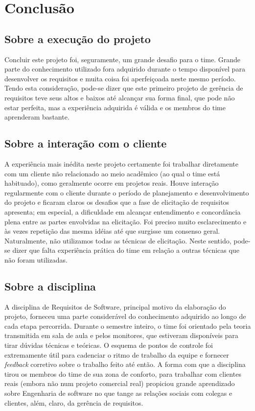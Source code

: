 \chapter[Conclusão]{Conclusão}

\section{Sobre a execução do projeto}
Concluir este projeto foi, seguramente, um grande desafio para o time. Grande parte do conhecimento utilizado fora adquirido durante o tempo disponível para desenvolver os requisitos e muita coisa foi aperfeiçoada neste mesmo período. Tendo esta consideração, pode-se dizer que este primeiro projeto de gerência de requisitos teve seus altos e baixos até alcançar sua forma final, que pode não estar perfeita, mas a experiência adquirida é válida e os membros do time aprenderam bastante.

\section{Sobre a interação com o cliente}
	A experiência mais inédita neste projeto certamente foi trabalhar diretamente com um cliente não relacionado ao meio acadêmico (ao qual o time está habituado), como geralmente ocorre em projetos reais.
Houve interação regularmente com o cliente durante o período de planejamento e desenvolvimento do projeto e ficaram claros os desafios que a fase de elicitação de requisitos apresenta; em especial, a dificuldade em alcançar entendimento e concordância plena entre as partes envolvidas na elicitação. Foi preciso muito esclarecimento e às vezes repetição das mesma idéias até que surgisse um consenso geral.
Naturalmente, não utilizamos todas as técnicas de elicitação. Neste sentido, pode-se dizer que falta experiência prática do time em relação a outras técnicas que não foram utilizadas.

\section{Sobre a disciplina}
A disciplina de Requisitos de Software, principal motivo da elaboração do projeto, forneceu uma parte considerável do conhecimento adquirido ao longo de cada etapa percorrida. Durante o semestre inteiro, o time foi orientado pela teoria transmitida em sala de aula e pelos monitores, que estiveram disponíveis para tirar dúvidas técnicas e teóricas.
O esquema de pontos de controle foi extremamente útil para cadenciar o ritmo de trabalho da equipe e fornecer \textit{feedback} corretivo sobre o trabalho feito até então.
A forma com que a disciplina tirou os membros do time de sua zona de conforto, para trabalhar com clientes reais (embora não num projeto comercial real) propiciou grande aprendizado sobre Engenharia de software no que tange as relações sociais com colegas e clientes, além, claro, da gerência de requisitos.

